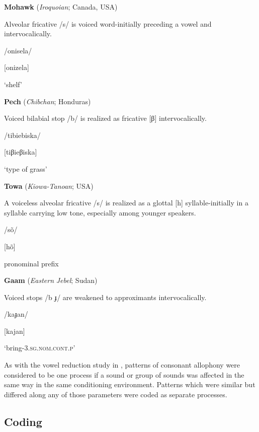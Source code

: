 \ea\label{ex:(7.14)}
  \textbf{Mohawk} (\textit{Iroquoian}; Canada, USA)

Alveolar fricative /s/ is voiced word-initially preceding a vowel and intervocalically.

/onisela/

[onizela]

\glt ‘shelf’

\citep[30-1]{Bonvillain1973}

\z

\ea\label{ex:(7.15)}
  \textbf{Pech} (\textit{Chibchan}; Honduras)

Voiced bilabial stop /b/ is realized as fricative [β] intervocalically.

/tibiebiska/

[tiβieβiska]

\glt ‘type of grass’

\citep[16]{Holt1999}

\z

\ea\label{ex:(7.16)}
  \textbf{Towa} (\textit{Kiowa-Tanoan}; USA)

A voiceless alveolar fricative /s/ is realized as a glottal [h] syllable-initially in a syllable carrying low tone, especially among younger speakers.

/sõ/

[hõ]

pronominal prefix

\citep[13]{Yumitani1998}
\z

\ea\label{ex:(7.17)}
  \textbf{Gaam} (\textit{Eastern} \textit{Jebel}; Sudan)

Voiced stops /b ɟ/ are weakened to approximants intervocalically.

/kaɟan/

[kajan]

\glt ‘bring-3.\textsc{sg.nom.cont.p}’

\citep[24-5]{Stirtz2011}
\z

  As with the vowel reduction study in , patterns of consonant allophony were considered to be one process if a sound or group of sounds was affected in the same way in the same conditioning environment. Patterns which were similar but differed along any of those parameters were coded as separate processes.

\subsection{Coding}\label{sec:7.2.2}

